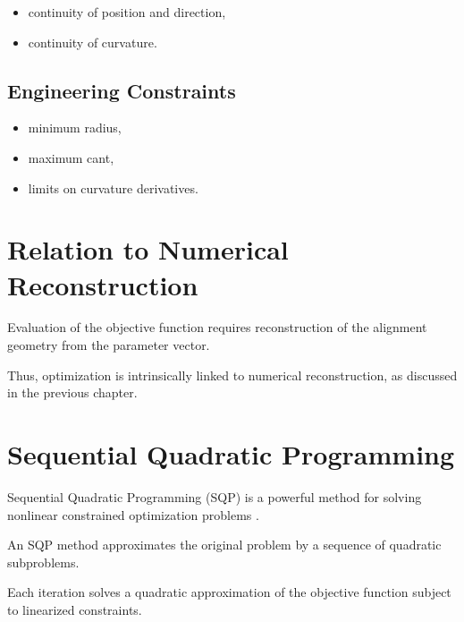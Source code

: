 \begin{itemize}
\item continuity of position and direction,
\item continuity of curvature.
\end{itemize}

\subsection{Engineering Constraints}

\begin{itemize}
\item minimum radius,
\item maximum cant,
\item limits on curvature derivatives.
\end{itemize}


\section{Relation to Numerical Reconstruction}

\begin{remark}
Evaluation of the objective function requires reconstruction of the
alignment geometry from the parameter vector.
\end{remark}

\begin{remark}
Thus, optimization is intrinsically linked to numerical reconstruction,
as discussed in the previous chapter.
\end{remark}

\section{Sequential Quadratic Programming}

\begin{remark}
Sequential Quadratic Programming (SQP) is a powerful method for solving
nonlinear constrained optimization problems
\cite{Nocedal2006NumericalOptimization}.
\end{remark}

\begin{definition}
An SQP method approximates the original problem by a sequence of
quadratic subproblems.
\end{definition}

\begin{remark}
Each iteration solves a quadratic approximation of the objective
function subject to linearized constraints.
\end{remark}

